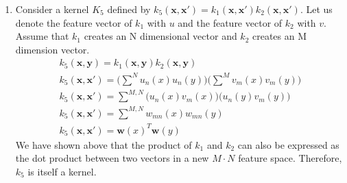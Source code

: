 \documentclass[12pt]{article}
\begin{document}
\begin{enumerate}[label=\alph*.]
	\item Consider a kernel $K_5$ defined by $k_5(\mathbf{x}, \mathbf{x'}) = k_1(\mathbf{x}, \mathbf{x'}) k_2(\mathbf{x}, \mathbf{x'})$. Let us denote the feature vector of $k_1$ with $u$ and the feature vector of $k_2$ with $v$. Assume that $k_1$ creates an N dimensional vector and $k_2$ creates an M dimension vector.
	\begin{gather*}
		k_5(\mathbf{x}, \mathbf{y}) = k_1(\mathbf{x}, \mathbf{y}) k_2(\mathbf{x}, \mathbf{y}) \\
		k_5(\mathbf{x}, \mathbf{x'}) = \big( \sum^N{u_n(x) u_n(y)} \big) \big( \sum^M{v_m(x) v_m(y)} \big) \\
		k_5(\mathbf{x}, \mathbf{x'}) = \sum^{M, N}{ \big( u_n(x) v_m(x) \big) \big( u_n(y) v_m(y) \big) } \\
		k_5(\mathbf{x}, \mathbf{x'}) = \sum^{M, N}{ w_{mn}(x) w_{mn}(y) } \\
		k_5(\mathbf{x}, \mathbf{x'}) = \mathbf{w}(x)^T \mathbf{w}(y)
	\end{gather*}
	We have shown above that the product of $k_1$ and $k_2$ can also be expressed as the dot product between two vectors in a new $M \cdot N$ feature space. Therefore, $k_5$ is itself a kernel.
	
\end{enumerate}
\end{document}
